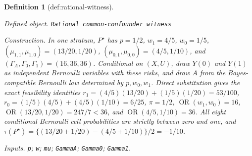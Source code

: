 \documentclass{article}
\newtheorem{definition}{Definition}
\begin{document}
\begin{definition}[def:rational-witness]\label{def:rational-witness}
\par\smallskip\noindent\emph{Defined object.} \texttt{Rational common-\allowbreak{}confounder witness}
\par\smallskip\noindent\emph{Construction.} In one stratum, \(P^\star\) has \(p=1/2\), \(w_1=4/5\), \(w_0=1/5\), \((\mu_{1,1},\mu_{1,0})=(13/20,1/20)\), \((\mu_{0,1},\mu_{0,0})=(4/5,1/10)\), and \((\Gamma_A,\Gamma_0,\Gamma_1)=(16,36,36)\).  Conditional on \((X,U)\), draw \(Y(0)\) and \(Y(1)\) as independent Bernoulli variables with these risks, and draw \(A\) from the Bayes-compatible Bernoulli law determined by \(p,w_0,w_1\).  Direct substitution gives the exact feasibility identities \(r_1=(4/5)(13/20)+(1/5)(1/20)=53/100\), \(r_0=(1/5)(4/5)+(4/5)(1/10)=6/25\), \(\pi=1/2\), \(\operatorname{OR}(w_1,w_0)=16\), \(\operatorname{OR}(13/20,1/20)=247/7<36\), and \(\operatorname{OR}(4/5,1/10)=36\).  All eight conditional Bernoulli cell probabilities are strictly between zero and one, and \(\tau(P^\star)=\{(13/20+1/20)-(4/5+1/10)\}/2=-1/10\).
\par\smallskip\noindent\emph{Inputs.} \texttt{p}; \texttt{w}; \texttt{mu}; \texttt{GammaA}; \texttt{Gamma0}; \texttt{Gamma1}.
\end{definition}
\end{document}

